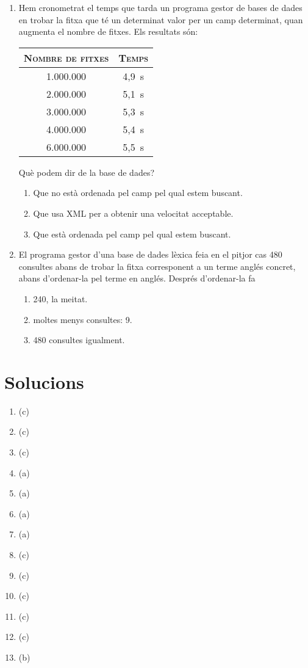 \begin{enumerate}
\item Hem cronometrat el temps que tarda un programa gestor de bases
  de dades en trobar la fitxa que té un determinat valor per un camp
  determinat, quan augmenta el nombre de fitxes. Els resultats són:
  \begin{center}
    \begin{tabular}{c|c}
      \hline\hline
      \textsc{Nombre de fitxes} & \textsc{Temps} \\
      \hline
      1.000.000 & 4,9~s \\
      2.000.000 & 5,1~s \\
      3.000.000 & 5,3~s \\
      4.000.000 & 5,4~s \\
      6.000.000 & 5,5~s \\
      \hline
    \end{tabular}
  \end{center}
  Què podem dir de la base de dades?
  \begin{enumerate}
  \item Que no està ordenada pel camp pel qual estem buscant.
  \item Que usa XML per a obtenir una velocitat acceptable.
  \item Que està ordenada pel camp pel qual estem buscant.
  \end{enumerate}

\item El programa gestor d'una base de dades lèxica feia en el pitjor
  cas 480 consultes abans de trobar la fitxa corresponent a un terme
  anglés concret, abans d'ordenar-la pel terme en anglés. Després
  d'ordenar-la fa
  \begin{enumerate}
  \item 240, la meitat.
  \item moltes menys consultes: 9.
  \item 480 consultes igualment.
  \end{enumerate}
\end{enumerate}

\section{Solucions}
\begin{enumerate}
\item (c)
\item (c)
\item (c)
\item (a)
\item (a)
\item (a)
\item (a)
\item (c)
\item (c)
\item (c)
\item (c)
\item (c)
\item (b) 
\end{enumerate}

